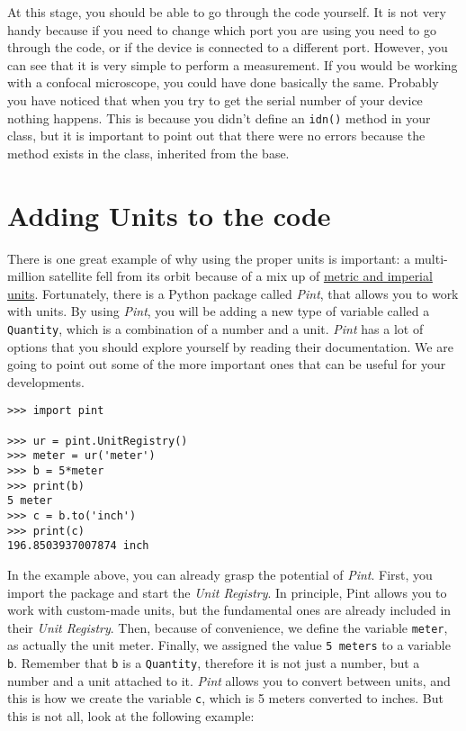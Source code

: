 At this stage, you should be able to go through the code yourself. It is
not very handy because if you need to change which port you are using
you need to go through the code, or if the device is connected to a
different port. However, you can see that it is very simple to perform a
measurement. If you would be working with a confocal microscope, you
could have done basically the same. Probably you have noticed that when
you try to get the serial number of your device nothing happens. This is
because you didn't define an \texttt{idn()} method in your class, but it
is important to point out that there were no errors because the method
exists in the class, inherited from the base.



\section{Adding Units to the code}\label{adding-units-to-thecode}

There is one great example of why using the proper units is important: a
multi-million satellite fell from its orbit because of a mix up of
\href{http://articles.latimes.com/1999/oct/01/news/mn-17288}{metric and
imperial units}. Fortunately, there is a Python package called
\emph{Pint}, that allows you to work with units. By using \emph{Pint},
you will be adding a new type of variable called a \texttt{Quantity},
which is a combination of a number and a unit. \emph{Pint} has a lot of
options that you should explore yourself by reading their documentation.
We are going to point out some of the more important ones that can be
useful for your developments.

\begin{verbatim}
>>> import pint

>>> ur = pint.UnitRegistry()
>>> meter = ur('meter')
>>> b = 5*meter
>>> print(b)
5 meter
>>> c = b.to('inch')
>>> print(c)
196.8503937007874 inch
\end{verbatim}

In the example above, you can already grasp the potential of
\emph{Pint}. First, you import the package and start the \emph{Unit
Registry}. In principle, Pint allows you to work with custom-made units,
but the fundamental ones are already included in their \emph{Unit
Registry}. Then, because of convenience, we define the variable
\texttt{meter}, as actually the unit meter. Finally, we assigned the
value \texttt{5\ meters} to a variable \texttt{b}. Remember that
\texttt{b} is a \texttt{Quantity}, therefore it is not just a number,
but a number and a unit attached to it. \emph{Pint} allows you to
convert between units, and this is how we create the variable
\texttt{c}, which is 5 meters converted to inches. But this is not all,
look at the following example:

